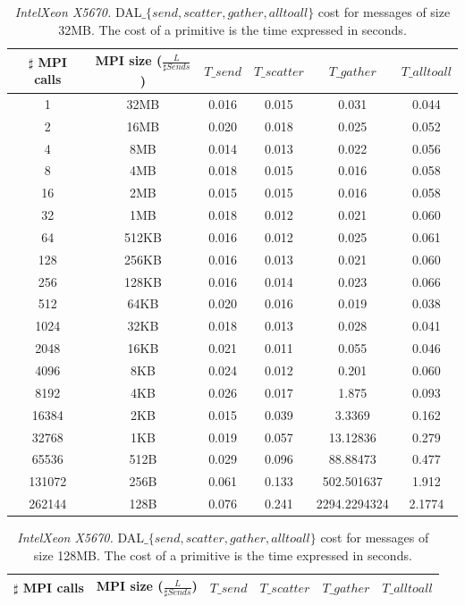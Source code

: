 \begin{table}[h]
\begin{center}
\begin{tabular}{|c|c|c|c|c|c|}\hline
\hline
$\sharp$ MPI calls & MPI size ($\frac{L}{\sharp Sends}$)  & $T\_send$   & $T\_scatter$  & $T\_gather$ & $T\_alltoall$      \\\hline\hline
1 & 32MB & 0.016 & 0.015 & 0.031 & 0.044 \\\hline
2 & 16MB & 0.020 & 0.018 & 0.025 & 0.052 \\\hline
4 & 8MB & 0.014 & 0.013 & 0.022 & 0.056 \\\hline
8 & 4MB & 0.018 & 0.015 & 0.016 & 0.058 \\\hline
16 & 2MB & 0.015 & 0.015 & 0.016 & 0.058 \\\hline
32 & 1MB & 0.018 & 0.012 & 0.021 & 0.060 \\\hline
64 & 512KB & 0.016 & 0.012 & 0.025 & 0.061 \\\hline
128 & 256KB & 0.016 & 0.013 & 0.021 & 0.060 \\\hline
256 & 128KB & 0.016 & 0.014 & 0.023 & 0.066 \\\hline
512 & 64KB & 0.020 & 0.016 & 0.019 & 0.038 \\\hline
1024 & 32KB & 0.018 & 0.013 & 0.028 & 0.041 \\\hline
2048 & 16KB & 0.021 & 0.011 & 0.055 & 0.046 \\\hline
4096 & 8KB & 0.024 & 0.012 & 0.201 & 0.060 \\\hline
8192 & 4KB & 0.026 & 0.017 & 1.875 & 0.093 \\\hline
16384 & 2KB & 0.015 & 0.039 & 3.3369 & 0.162 \\\hline
32768 & 1KB & 0.019 & 0.057 & 13.12836 & 0.279 \\\hline
65536 & 512B & 0.029 & 0.096 & 88.88473 & 0.477 \\\hline
131072 & 256B & 0.061 & 0.133 & 502.501637 & 1.912 \\\hline
262144 & 128B & 0.076 & 0.241 & 2294.2294324 & 2.1774 \\\hline
\end{tabular}
\caption{\textit{IntelXeon X5670.} DAL$\_\lbrace send, scatter, gather, alltoall \rbrace$ cost for messages of size 32MB. The cost of a primitive is the time expressed in seconds. }
\label{tsetup-xeon-n8-M32}
\end{center}
\end{table}

\begin{table}[h]
\begin{center}
\begin{tabular}{|c|c|c|c|c|c|}\hline
\hline
$\sharp$ MPI calls & MPI size ($\frac{L}{\sharp Sends}$)  & $T\_send$   & $T\_scatter$  & $T\_gather$ & $T\_alltoall$      \\\hline\hline

\end{tabular}
\caption{\textit{IntelXeon X5670.} DAL$\_\lbrace send, scatter, gather, alltoall \rbrace$ cost for messages of size 128MB. The cost of a primitive is the time expressed in seconds.}
\label{tsetup-xeon-n8-M128}
\end{center}
\end{table}

